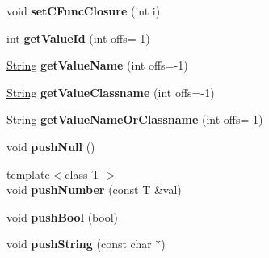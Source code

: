 \begin{DoxyCompactItemize}
\item 
void {\bfseries set\+C\+Func\+Closure} (int i)\hypertarget{class_object_script_1_1_o_s_a972bf385502d979741afb8ff28b88d9f}{}\label{class_object_script_1_1_o_s_a972bf385502d979741afb8ff28b88d9f}

\item 
int {\bfseries get\+Value\+Id} (int offs=-\/1)\hypertarget{class_object_script_1_1_o_s_a82e9f27604a38db22d27afa69b92779e}{}\label{class_object_script_1_1_o_s_a82e9f27604a38db22d27afa69b92779e}

\item 
\hyperlink{class_object_script_1_1_o_s_1_1_string}{String} {\bfseries get\+Value\+Name} (int offs=-\/1)\hypertarget{class_object_script_1_1_o_s_a33391095534216daa0fe408e598ebf76}{}\label{class_object_script_1_1_o_s_a33391095534216daa0fe408e598ebf76}

\item 
\hyperlink{class_object_script_1_1_o_s_1_1_string}{String} {\bfseries get\+Value\+Classname} (int offs=-\/1)\hypertarget{class_object_script_1_1_o_s_ade02e8e63d534e1cfb8e345d7e07b4c8}{}\label{class_object_script_1_1_o_s_ade02e8e63d534e1cfb8e345d7e07b4c8}

\item 
\hyperlink{class_object_script_1_1_o_s_1_1_string}{String} {\bfseries get\+Value\+Name\+Or\+Classname} (int offs=-\/1)\hypertarget{class_object_script_1_1_o_s_a655af4e5f2b5d496e57796fa4fbe28e9}{}\label{class_object_script_1_1_o_s_a655af4e5f2b5d496e57796fa4fbe28e9}

\item 
void {\bfseries push\+Null} ()\hypertarget{class_object_script_1_1_o_s_a08afa7248937ad16644b00368e234bc9}{}\label{class_object_script_1_1_o_s_a08afa7248937ad16644b00368e234bc9}

\item 
{\footnotesize template$<$class T $>$ }\\void {\bfseries push\+Number} (const T \&val)\hypertarget{class_object_script_1_1_o_s_a29c3d9fb8dfccf7c54e972e9a72958f2}{}\label{class_object_script_1_1_o_s_a29c3d9fb8dfccf7c54e972e9a72958f2}

\item 
void {\bfseries push\+Bool} (bool)\hypertarget{class_object_script_1_1_o_s_acde3f37a9dffd531d8e474c1cfffbe4f}{}\label{class_object_script_1_1_o_s_acde3f37a9dffd531d8e474c1cfffbe4f}

\item 
void {\bfseries push\+String} (const char $\ast$)\hypertarget{class_object_script_1_1_o_s_a9d08679da9b736eb89b983f779d27ec3}{}\label{class_object_script_1_1_o_s_a9d08679da9b736eb89b983f779d27ec3}


\end{DoxyCompactItemize}

